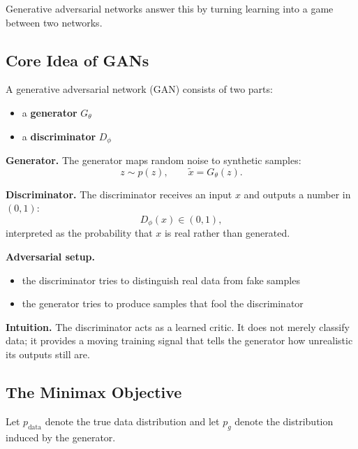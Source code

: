 \medskip

\noindent
Generative adversarial networks answer this by turning learning into a game between two networks.

\subsection{Core Idea of GANs}

A generative adversarial network (GAN) consists of two parts:

\begin{itemize}
    \item a \textbf{generator} $G_\theta$
    \item a \textbf{discriminator} $D_\phi$
\end{itemize}

\medskip

\noindent
\textbf{Generator.}
The generator maps random noise to synthetic samples:
\[
z \sim p(z), \qquad \tilde{x}=G_\theta(z).
\]

\medskip

\noindent
\textbf{Discriminator.}
The discriminator receives an input $x$ and outputs a number in $(0,1)$:
\[
D_\phi(x)\in(0,1),
\]
interpreted as the probability that $x$ is real rather than generated.

\medskip

\noindent
\textbf{Adversarial setup.}

\begin{itemize}
    \item the discriminator tries to distinguish real data from fake samples
    \item the generator tries to produce samples that fool the discriminator
\end{itemize}

\medskip

\noindent
\textbf{Intuition.}
The discriminator acts as a learned critic. It does not merely classify data; it provides a moving training signal that tells the generator how unrealistic its outputs still are.

\subsection{The Minimax Objective}

Let $p_{\text{data}}$ denote the true data distribution and let $p_g$ denote the distribution induced by the generator.

\medskip

